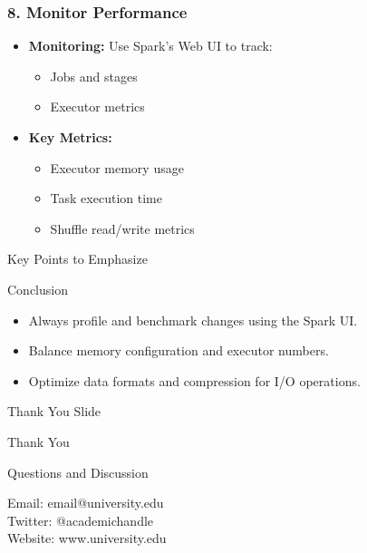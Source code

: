 \documentclass[aspectratio=169]{beamer}
\begin{document}
\begin{frame}[fragile]
    \frametitle{8. Monitor Performance}
    \begin{itemize}
        \item \textbf{Monitoring:}
        Use Spark's Web UI to track:
        \begin{itemize}
            \item Jobs and stages
            \item Executor metrics
        \end{itemize}
        
        \item \textbf{Key Metrics:}
        \begin{itemize}
            \item Executor memory usage
            \item Task execution time
            \item Shuffle read/write metrics
        \end{itemize}
    \end{itemize}
\end{frame}

\begin{frame}{Key Points to Emphasize}
    \begin{block}{Conclusion}
        \begin{itemize}
            \item Always profile and benchmark changes using the Spark UI.
            \item Balance memory configuration and executor numbers.
            \item Optimize data formats and compression for I/O operations.
        \end{itemize}
    \end{block}
\end{frame}

\begin{frame}{Thank You Slide}
    \begin{center}
        \vspace{1cm}
        {\Large Thank You}
        
        \vspace{0.5cm}
        {\large Questions and Discussion}
        
        \vspace{1.5cm}
        {\small
        Email: email@university.edu\\
        \vspace{0.2cm}
        Twitter: @academichandle\\
        Website: www.university.edu}
    \end{center}
\end{frame}
\end{document}
